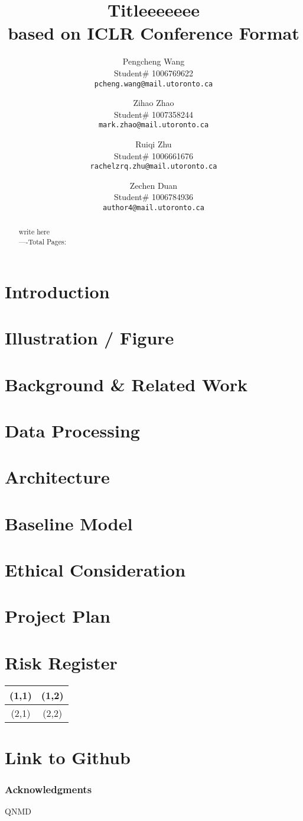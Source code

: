 \documentclass{article}
\title{Titleeeeeee  \\ 
based on ICLR Conference Format}
\author{Pengcheng Wang  \\
Student\# 1006769622\\
\texttt{pcheng.wang@mail.utoronto.ca} \\
\And}
\author{Zihao Zhao  \\
Student\# 1007358244 \\
\texttt{mark.zhao@mail.utoronto.ca} \\
\AND}
\author{Ruiqi Zhu  \\
Student\# 1006661676 \\
\texttt{rachelzrq.zhu@mail.utoronto.ca} \\
\And}
\author{Zechen Duan \\
Student\# 1006784936 \\
\texttt{author4@mail.utoronto.ca} \\
\AND
}
\begin{document}
\maketitle

\begin{abstract}
write here\\
----Total Pages: \pageref{last_page}
\end{abstract}


\section{Introduction}

\section{Illustration / Figure}

\section{Background & Related Work}

\section{Data Processing}

\section{Architecture}

\section{Baseline Model}

\section{Ethical Consideration}

\section{Project Plan}

\section{Risk Register}

\begin{tabular}{|c|c|}%
\hline  %
(1,1)&(1,2)\\
\hline  %
(2,1)&(2,2)\\
\hline %
\end{tabular}



\section{Link to Github}

\newpage
\subsubsection*{Acknowledgments}
QNMD

\label{last_page}

\newpage


\end{document}
